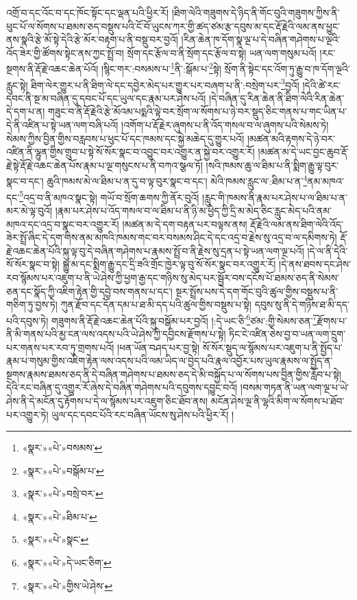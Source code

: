 འགྲོ་བ་དང་འོང་བ་དང་ཁོང་སྟོང་དང་ལྡན་པའི་ཕྱིར་རོ། །ཐིག་ལེའི་གཟུགས་དེ་ཉིད་ནི་གོང་བུའི་གཟུགས་ཀྱིས་ནི་ཕུང་པོ་ལ་སོགས་པ་ཐམས་ཅད་བསྡུས་པའི་ངོ་བོ་ཡུངས་ཀར་གྱི་ཚད་ཙམ་རྩ་དབུས་མ་དང་རྡོ་རྗེའི་ལམ་ནས་ཕྱུང་ནས་སྣའི་རྩེ་མོ་སྟེ་དེའི་རྩེ་མོར་བརྟག་པ་ནི་བསྡུ་བར་བྱའོ། །རིན་ཆེན་ཁ་དོག་སྣ་ལྔ་པ་དེ་བཞིན་གཤེགས་པ་ལྔའི་འོད་ཟེར་གྱི་ཚོགས་སྟེང་ནས་ཀྱང་སྤྲོ་བ། སྲོག་དང་རྩོལ་བ་ནི་སྲོག་དང་རྩོལ་བ་སྟེ། ཡན་ལག་གསུམ་པའོ། །རང་སྔགས་ནི་རྡོ་རྗེ་འཆང་ཆེན་པོའོ། །སྙིང་གར་:བསམས་པ་\footnote{«སྣར་»«པེ་»བསམས་}ནི་:སྒོམ་པ་\footnote{«སྣར་»«པེ་»བསྒོམ་པ་}སྟེ། སྲོག་ནི་སྟེང་དང་འོག་ཏུ་རྒྱུ་བ་ཁ་དོག་ལྔའི་རླུང་སྟེ། ཐིག་ལེར་གྱུར་པ་ནི་ཐིག་ལེ་དང་དབྱེར་མེད་པར་གྱུར་པར་བཞག་པ་ནི་:བསྲེག་པར་\footnote{«སྣར་»«པེ་»བསྲེ་བར་}བྱའོ། །དེའི་ཚེ་རང་དབང་ནི་སྔ་མ་བཞིན་དུ་དབང་པོ་དང་ཡུལ་དང་རྣམ་པར་ཤེས་པའོ། །དེ་བཞིན་དུ་རིན་ཆེན་ནི་ཐིག་ལེའི་རིན་ཆེན་དེ་དག་པ་ན། གཟུང་བ་ནི་རྡོ་རྗེའི་རྩེ་མོའམ་པདྨའི་ལྟེ་བར་སྲོག་ལ་སོགས་པ་ཉེ་བར་སྡུད་ཅིང་གནས་པ་གང་ཡིན་པ་དེ་ནི་འཛིན་པ་སྟེ་ཡན་ལག་བཞི་པའོ། །འགོག་པ་རྡོ་རྗེར་ཞུགས་པ་ནི་འོད་གསལ་བ་ལ་ཞུགས་པའི་སེམས་ཏེ། སེམས་ཀྱིས་བྱིན་གྱིས་བརླབས་པ་ཕུང་པོ་དང་ཁམས་དང་སྐྱེ་མཆེད་དུ་གྱུར་པའོ། །མཚན་མའི་རྟགས་དེ་ཉེ་བར་འཛིན་ནི་ལྷུན་གྱིས་གྲུབ་པ་སྟེ་སོ་སོར་སྣང་བ་འབྱུང་བར་འགྱུར་ན་སྐྱེ་བར་འགྱུར་རོ། །མཚན་མ་དེ་ཡང་བྱང་ཆུབ་རྡོ་རྗེ་སྟེ་རྡོ་རྗེ་འཆང་ཆེན་པོས་རྣམ་པ་ལྔ་གསུངས་པ་ནི་བཀའ་སྩལ་ཏོ། །སའི་ཁམས་ཆུ་ལ་ཐིམ་པ་ནི་སྨིག་རྒྱུ་ལྟ་བུར་སྣང་བ་དང་། ཆུའི་ཁམས་མེ་ལ་ཐིམ་པ་ན་དུ་བ་ལྟ་བུར་སྣང་བ་དང་། མེའི་ཁམས་རླུང་ལ་:ཐིམ་པ་ན་\footnote{«སྣར་»«པེ་»ཐིམ་པ་}ནམ་མཁའ་དང་\footnote{«སྣར་»«པེ་»སྣང་}འདྲ་བ་ནི་མཁའ་སྣང་སྟེ། གཡོ་བ་སྲོག་ཆགས་ཀྱི་ནོར་བུའོ། །རླུང་གི་ཁམས་ནི་རྣམ་པར་ཤེས་པ་ལ་ཐིམ་པ་ན་མར་མེ་ལྟ་བུའོ། །རྣམ་པར་ཤེས་པ་འོད་གསལ་བ་ལ་ཐིམ་པ་ནི་ཉི་མ་ཕྱེད་ཀྱི་དྲི་མ་མེད་ཅིང་རླུང་མེད་པའི་ནམ་མཁའ་དང་འདྲ་བ་སྣང་བར་འགྱུར་རོ། །མཚན་མ་དེ་དག་བརྟན་པར་བལྟས་ནས། རྡོ་རྗེའི་ལམ་ནས་ཐིག་ལེའི་འོད་ཟེར་སྤྲོ་ཞིང་དེ་དག་གིས་ནམ་མཁའི་ཁམས་གང་བར་བསམས་ཤིང་དེ་དང་འདྲ་བ་རྗེས་སུ་འདྲ་བ་ལ་དམིགས་ཏེ། རྡོ་རྗེ་འཆང་ཆེན་པོའི་སྐུ་ལྟ་བུ་དེ་བཞིན་གཤེགས་པ་རྣམས་སྤྲོ་བ་ནི་རྗེས་སུ་དྲན་པ་སྟེ་ཡན་ལག་ལྔ་པའོ། །དེ་ལ་ནི་དེའི་སོ་སོར་སྣང་བ་སྟེ། སྒྱུ་མ་དང་སྨིག་རྒྱུ་དང་དྲི་ཟའི་གྲོང་ཁྱེར་ལྟ་བུ་སོ་སོར་སྣང་བར་འགྱུར་རོ། །དེ་ནས་ཐབས་དང་ཤེས་རབ་སྙོམས་པར་འཇུག་པ་ནི་ཡེ་ཤེས་ཀྱི་ཕྱག་རྒྱ་དང་གཉིས་སུ་མེད་པར་སྦྱོར་བས་དངོས་པོ་ཐམས་ཅད་ནི་སེམས་ཅན་དང་སྣོད་ཀྱི་འཇིག་རྟེན་གྱི་དབྱེ་བས་གནས་པ་དང་། སྔར་སྤྲོས་པས་དེ་དག་གོང་བུའི་ཚུལ་གྱིས་བསྡུས་པ་ནི་གཅིག་ཏུ་བྱས་ཏེ། ཀུན་རྫོབ་དང་དོན་དམ་པ་ཐ་མི་དད་པའི་ཚུལ་གྱིས་བསྡུས་པ་སྟེ། དབུས་སུ་ནི་དེ་གཉིས་ཐ་མི་དད་པའི་དབུས་ཏེ། གཟུགས་ནི་རྡོ་རྗེ་འཆང་ཆེན་པོའི་སྐུ་བསྒོམ་པར་བྱའོ། །:དེ་ཡང་ཅི་\footnote{«སྣར་»«པེ་»དེ་ཡང་ཅིག་}ཙམ་:གྱི་སེམས་ཅན་\footnote{«སྣར་»«པེ་»གྱིས་ཡེ་ཤེས་}རྫོགས་པ་ནི་མི་གནས་པའི་མྱ་ངན་ལས་འདས་པའི་ཡེ་ཤེས་ཀྱི་དབྱིངས་རྫོགས་པ་སྟེ། ཏིང་ངེ་འཛིན་ཅེས་བྱ་བ་ཡན་ལག་དྲུག་པར་གནས་པར་རབ་ཏུ་གྲགས་པའོ། །ཕན་ཡོན་བཤད་པར་བྱ་སྟེ། སོ་སོར་སྡུད་ལ་སྙོམས་པར་འཇུག་པ་ནི་སྤྱོད་པ་རྣམ་པ་གསུམ་གྱིས་འཇིག་རྟེན་ལས་འདས་པའི་ལམ་ཡིད་ལ་བྱེད་པའི་རྣལ་འབྱོར་པས་ཡུལ་རྣམས་ལ་སྤྱོད་ན་སྔགས་རྣམས་ཐམས་ཅད་ནི་དེ་བཞིན་གཤེགས་པ་ཐམས་ཅད་དེ་མི་བསྐྱོད་པ་ལ་སོགས་པས་བྱིན་གྱིས་རློབ་པ་སྟེ། དེའི་རང་བཞིན་དུ་འགྱུར་རོ་ཞེས་དེ་བཞིན་གཤེགས་པའི་དབུགས་དབྱུང་བའོ། །བསམ་གཏན་ནི་ཡན་ལག་ལྔ་པ་ཡེ་ཤེས་ནི་དེ་མངོན་དུ་རྟོགས་པ་དེ་ལ་སྙོམས་པར་འཇུག་ཅིང་ཐོབ་ནས། མངོན་ཤེས་ལྔ་ནི་ལྷའི་མིག་ལ་སོགས་པ་ཐོབ་པར་འགྱུར་ཏེ། ཡུལ་དང་དབང་པོའི་རང་བཞིན་ཡོངས་སུ་ཤེས་པའི་ཕྱིར་རོ། །
